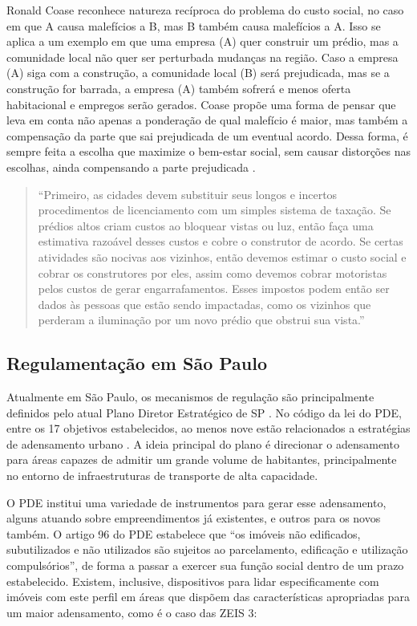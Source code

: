 Ronald Coase reconhece natureza recíproca do problema do custo social, no caso em que A causa malefícios a B, mas B também causa malefícios a A. Isso se aplica a um exemplo em que uma empresa (A) quer construir um prédio, mas a comunidade local não quer ser perturbada mudanças na região. Caso a empresa (A) siga com a construção, a comunidade local (B) será prejudicada, mas se a construção for barrada, a empresa (A) também sofrerá e menos oferta habitacional e empregos serão gerados. Coase propõe uma forma de pensar que leva em conta não apenas a ponderação de qual malefício é maior, mas também a compensação da parte que sai prejudicada de um eventual acordo. Dessa forma, é sempre feita a escolha que maximize o bem-estar social, sem causar distorções nas escolhas, ainda compensando a parte prejudicada \cite{coase2013problem}.

\begin{quotation}
   ``Primeiro, as cidades devem substituir seus longos e incertos procedimentos de licenciamento com um simples sistema de taxação. Se prédios altos criam custos ao bloquear vistas ou luz, então faça uma estimativa razoável desses custos e cobre o construtor de acordo. Se certas atividades são nocivas aos vizinhos, então devemos estimar o custo social e cobrar os construtores por eles, assim como devemos cobrar motoristas pelos custos de gerar engarrafamentos. Esses impostos podem então ser dados às pessoas que estão sendo impactadas, como os vizinhos que perderam a iluminação por um novo prédio que obstrui sua vista.'' \cite{glaeser2011triumph}

\end{quotation}

\subsection*{\textbf{Regulamentação em São Paulo}}

Atualmente em São Paulo, os mecanismos de regulação são principalmente definidos pelo atual Plano Diretor Estratégico de SP \cite[PDE]{PDE}. No código da lei do PDE, entre os 17 objetivos estabelecidos, ao menos nove estão relacionados a estratégias de adensamento urbano \cite{lima2021alem}. A ideia principal do plano é direcionar o adensamento para áreas capazes de admitir um grande volume de habitantes, principalmente no entorno de infraestruturas de transporte de alta capacidade.

O PDE institui uma variedade de instrumentos para gerar esse adensamento, alguns atuando sobre empreendimentos já existentes, e outros para os novos também. O artigo 96 do PDE estabelece que ``os imóveis não edificados, subutilizados e não utilizados são sujeitos ao parcelamento, edificação e utilização compulsórios'', de forma a passar a exercer sua função social dentro de um prazo estabelecido. Existem, inclusive, dispositivos para lidar especificamente com imóveis com este perfil em áreas que dispõem das características apropriadas para um maior adensamento, como é o caso das ZEIS 3:

